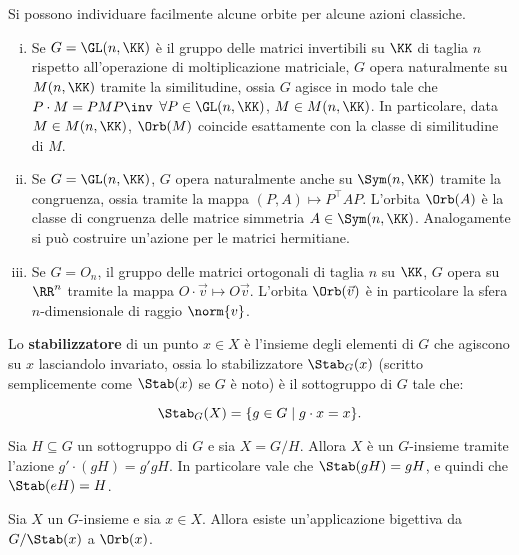\documentclass[11pt]{article}
\begin{document}
	\begin{example} Si possono individuare facilmente alcune orbite per alcune azioni classiche.
		\begin{enumerate}[(i)]
			\item Se $G = \GL(n, \KK)$ è il gruppo delle matrici invertibili su $\KK$ di taglia $n$ rispetto
			all'operazione di moltiplicazione matriciale, $G$ opera naturalmente su $M(n, \KK)$ tramite
			la similitudine, ossia $G$ agisce in modo tale che $P \cdot M = P M P\inv$ $\forall P \in \GL(n, \KK)$,
			$M \in M(n, \KK)$. In particolare, data $M \in M(n, \KK)$, $\Orb(M)$ coincide esattamente
			con la classe di similitudine di $M$.
			
			\item Se $G = \GL(n, \KK)$, $G$ opera naturalmente anche su $\Sym(n, \KK)$
			tramite la congruenza, ossia tramite la mappa $(P, A) \mapsto P^\top A P$. L'orbita $\Orb(A)$ è la classe di congruenza delle matrice simmetria $A \in \Sym(n, \KK)$. Analogamente si può costruire un'azione per le
			matrici hermitiane.
			
			\item Se $G = O_n$, il gruppo delle matrici ortogonali di taglia $n$ su $\KK$, $G$ opera su $\RR^n$ tramite la mappa $O \cdot \vec v \mapsto O \vec v$. L'orbita $\Orb(\vec v)$ è in particolare la sfera $n$-dimensionale di raggio $\norm{v}$.
		\end{enumerate}
	\end{example}

	\begin{definition} [stabilizzatore di $x$]
		Lo \textbf{stabilizzatore} di un punto $x \in X$ è l'insieme degli elementi di $G$ che
		agiscono su $x$ lasciandolo invariato, ossia lo stabilizzatore $\Stab_G(x)$ (scritto semplicemente come $\Stab(x)$ se $G$ è noto) è il sottogruppo
		di $G$ tale che:
		
		\[ \Stab_G(X) = \{g \in G \mid g \cdot x = x \}. \]
	\end{definition}

	\begin{example}
		Sia $H \subseteq G$ un sottogruppo di $G$ e sia $X = G/H$. Allora $X$ è un $G$-insieme tramite l'azione $g' \cdot (gH) = g'gH$. In particolare
		vale che $\Stab(gH) = gH$, e quindi che $\Stab(eH) = H$.
	\end{example}

	\begin{theorem} 
		Sia $X$ un $G$-insieme e sia $x \in X$. Allora esiste un'applicazione
		bigettiva da $G/\Stab(x)$ a $\Orb(x)$.
	\end{theorem}
\end{document}
